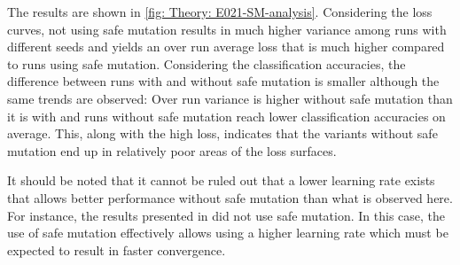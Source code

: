 The results are shown in \autoref{fig: Theory: E021-SM-analysis}. Considering the loss curves, not using safe mutation results in much higher variance among runs with different seeds and yields an over run average loss that is much higher compared to runs using safe mutation. Considering the classification accuracies, the difference between runs with and without safe mutation is smaller although the same trends are observed: Over run variance is higher without safe mutation than it is with and runs without safe mutation reach lower classification accuracies on average. This, along with the high loss, indicates that the variants without safe mutation end up in relatively poor areas of the loss surfaces.

It should be noted that it cannot be ruled out that a lower learning rate exists that allows better performance without safe mutation than what is observed here. For instance, the results presented in \cite{Salimans2017} did not use safe mutation. In this case, the use of safe mutation effectively allows using a higher learning rate which must be expected to result in faster convergence.

\newpage